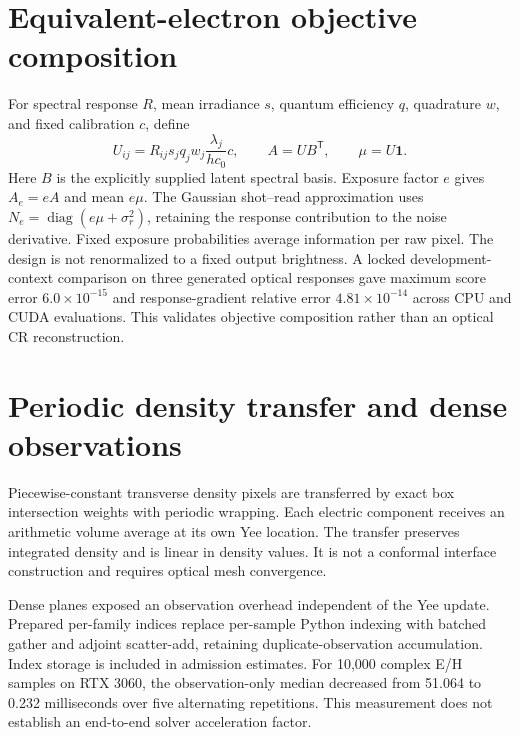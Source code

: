 \documentclass[11pt,a4paper]{article}
\begin{document}
\section{Equivalent-electron objective composition}
For spectral response $R$, mean irradiance $s$, quantum efficiency $q$,
quadrature $w$, and fixed calibration $c$, define
\[
U_{ij}=R_{ij}s_j q_j w_j\frac{\lambda_j}{hc_0}c,
\qquad A=UB^{\mathsf T},\qquad \mu=U\mathbf{1}.
\]
Here $B$ is the explicitly supplied latent spectral basis. Exposure factor
$e$ gives $A_e=eA$ and mean $e\mu$. The Gaussian shot--read approximation
uses $N_e=\operatorname{diag}(e\mu+\sigma_r^2)$, retaining the response
contribution to the noise derivative. Fixed exposure probabilities average
information per raw pixel. The design is not renormalized to a fixed output
brightness. A locked development-context comparison on three generated optical
responses gave maximum score error $6.0\times10^{-15}$ and response-gradient
relative error $4.81\times10^{-14}$ across CPU and CUDA evaluations.
This validates objective composition rather than an optical CR reconstruction.

\section{Periodic density transfer and dense observations}
Piecewise-constant transverse density pixels are transferred by exact box
intersection weights with periodic wrapping. Each electric component receives
an arithmetic volume average at its own Yee location. The transfer preserves
integrated density and is linear in density values. It is not a conformal
interface construction and requires optical mesh convergence.

Dense planes exposed an observation overhead independent of the Yee update.
Prepared per-family indices replace per-sample Python indexing with batched
gather and adjoint scatter-add, retaining duplicate-observation accumulation.
Index storage is included in admission estimates. For 10,000 complex E/H
samples on RTX 3060, the observation-only median decreased from 51.064 to
0.232 milliseconds over five alternating repetitions. This measurement does
not establish an end-to-end solver acceleration factor.
\end{document}
